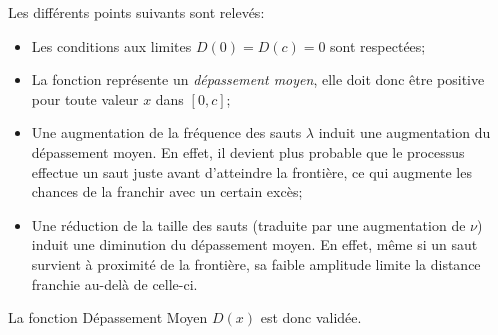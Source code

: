 Les différents points suivants sont relevés:
\begin{itemize}
    \item Les conditions aux limites $D(0)=D(c)=0$ sont respectées;
    \item La fonction représente un \textit{dépassement moyen}, elle doit donc être positive pour toute valeur $x$ dans $[0,c]$;
    \item Une augmentation de la fréquence des sauts $\lambda$ induit une augmentation du dépassement moyen. En effet, il devient plus probable que le processus effectue un saut juste avant d'atteindre la frontière, ce qui augmente les chances de la franchir avec un certain excès;
    \item Une réduction de la taille des sauts (traduite par une augmentation de $\nu$) induit une diminution du dépassement moyen. En effet, même si un saut survient à proximité de la frontière, sa faible amplitude limite la distance franchie au-delà de celle-ci.
\end{itemize}
La fonction Dépassement Moyen $D(x)$ est donc validée.

